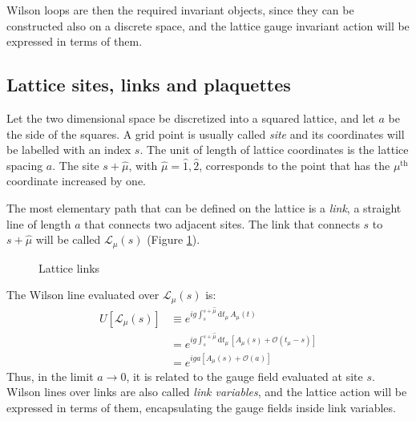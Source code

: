 Wilson loops are then the required invariant objects, since they can be constructed also on a discrete space,
and the lattice gauge invariant action will be expressed in terms of them.

\subsection*{Lattice sites, links and plaquettes}
Let the two dimensional space be discretized into a squared lattice, and let $a$ be the side of the squares.
A grid point is usually called \emph{site} and its coordinates will be labelled with an index $s$.
The unit of length of lattice coordinates is the lattice spacing $a$.
The site $s + \hat\mu$, with $\hat\mu = \hat1,\hat2$, corresponds to the point that has the $\mu^\mathrm{th}$ coordinate increased by one.

The most elementary path that can be defined on the lattice is a \emph{link},
\ie a straight line of length $a$ that connects two adjacent sites.
The link that connects $s$ to $s+\hat\mu$ will be called $\mathcal L_\mu(s)$ (Figure \ref{fig:links}).
\begin{figure}[!htb]
    \centering
    \caption{Lattice links}
    \label{fig:links}
\end{figure}

The Wilson line evaluated over $\mathcal L_\mu(s)$ is:
\begin{equation}\label{eq:link}
    \begin{aligned}
        U[\mathcal L_{\mu}(s)] &\equiv e^{ig\int_s^{s+\hat\mu}\mathrm dt_\mu\,A_\mu(t)} \\
                       &= e^{ig\int_s^{s+\hat\mu}\mathrm dt_\mu\,\left[A_\mu(s) + \mathcal O\left(t_\mu-s\right)\right]} \\
                       &= e^{iga\left[A_\mu(s) + \mathcal O\left(a\right)\right]}
    \end{aligned}
\end{equation}
Thus, in the limit $a \to 0$, it is related to the gauge field evaluated at site $s$.
Wilson lines over links are also called \emph{link variables}, and the lattice action will be expressed in terms of them,
encapsulating the gauge fields inside link variables.

